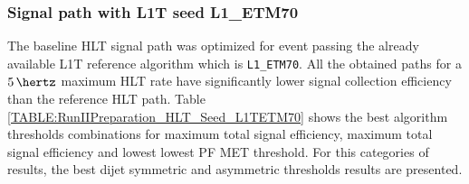 \subsubsection{Signal path with L1T seed L1\_ETM70}
\label{SECTION:RunIITriggerStudies_HLTAlgorithmDevelopment_L1ETM70}


The baseline \gls{HLT} signal path was optimized for event passing the already available \gls{L1T} reference algorithm which is \verb|L1_ETM70|. All the obtained paths for a $5\,\hertz$ maximum \gls{HLT} rate have significantly lower signal collection efficiency than the reference \gls{HLT} path. Table \ref{TABLE:RunIIPreparation_HLT_Seed_L1TETM70} shows the best algorithm thresholds combinations for maximum total signal efficiency, maximum total signal efficiency and lowest lowest \gls{PF} \gls{MET} threshold. For this categories of results, the best dijet symmetric and asymmetric \pt thresholds results are presented.

